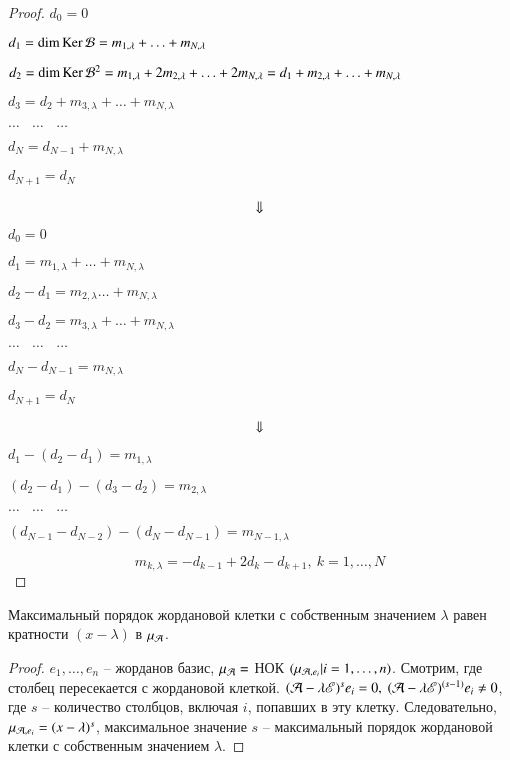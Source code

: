\documentclass[main]{subfiles}
\begin{document}
\begin{proof}
$d_0 = 0$ 

$d_1 = \dim\operatorname{Ker}{\mathcal{B}} = m_{1,\lambda} + \ldots + m_{N,\lambda}$

$d_2 = \dim\operatorname{Ker}{\mathcal{B}}^2 = m_{1,\lambda} + 2m_{2,\lambda} + \ldots + 2m_{N,\lambda} = d_1 + m_{2,\lambda}+ \ldots + m_{N,\lambda}$

$d_3 = d_2 + m_{3,\lambda} + \ldots + m_{N,\lambda}$

$\dots \ \ \ \ \dots \ \ \ \ \dots$

$d_N = d_{N-1} + m_{N,\lambda}$

$d_{N+1} = d_N$

\[
  \rotatebox[origin=c]{270}{$\Rightarrow$}
\]

$d_0 = 0$

$d_1 = m_{1,\lambda} + \ldots + m_{N,\lambda}$

$d_2 - d_1 = m_{2,\lambda} \ldots + m_{N,\lambda} $

$d_3 - d_2 = m_{3,\lambda} + \ldots + m_{N,\lambda}$

$\dots \ \ \ \ \dots \ \ \ \ \dots$

$d_N - d_{N-1} = m_{N,\lambda}$

$d_{N+1} = d_N$

\[
  \rotatebox[origin=c]{270}{$\Rightarrow$}
\]

$d_1 - (d_2 -d_1) = m_{1,\lambda}$

$(d_2 - d_1) -(d_3- d_2) = m_{2,\lambda}$

$\dots \ \ \ \ \dots \ \ \ \ \dots$

$(d_{N-1} - d_{N-2}) -(d_N -d_{N-1}) = m_{N-1,\lambda}$

\[
  m_{k,\lambda} = -d_{k-1}+2d_k-d_{k+1},\ k = 1,\ldots, N
\]

\end{proof}

\begin{remark}
  Максимальный порядок жордановой клетки с собственным значением $\lambda$
  равен кратности $(x - \lambda)$ в $\mu_{\mathcal{A}}$.
\end{remark}

\begin{proof}
  $e_1, \ldots, e_n$ -- жорданов базис, $\mu_{\mathcal{A}}=$ НОК $(\mu_{\mathcal{A}, e_i} | i = 1, \ldots, n)$. Смотрим, где столбец пересекается с жордановой клеткой.
  $(\mathcal{A} - \lambda \mathscr{E})^s e_i = 0, \ (\mathcal{A} - \lambda \mathscr{E})^{(s-1)} e_i \neq 0$, где $s$ -- количество столбцов, включая $i$, попавших в эту клетку.
  Следовательно, $\mu_{\mathcal{A}, e_i} = (x - \lambda)^s$, максимальное значение $s$ -- максимальный порядок жордановой клетки с собственным значением $\lambda$.
\end{proof}
\end{document}
